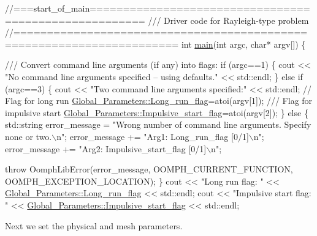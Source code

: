 \begin{DoxyCodeInclude}
\textcolor{comment}{//===start\_of\_main======================================================}
\textcolor{comment}{/// Driver code for Rayleigh-type problem}
\textcolor{comment}{}\textcolor{comment}{//======================================================================}
\textcolor{keywordtype}{int} \hyperlink{rayleigh__traction__channel_8cc_a0ddf1224851353fc92bfbff6f499fa97}{main}(\textcolor{keywordtype}{int} argc, \textcolor{keywordtype}{char}* argv[]) 
\{

\textcolor{comment}{}
\textcolor{comment}{ /// Convert command line arguments (if any) into flags:}
\textcolor{comment}{} \textcolor{keywordflow}{if} (argc==1)
  \{
   cout << \textcolor{stringliteral}{"No command line arguments specified -- using defaults."} << std::endl;
  \}
 \textcolor{keywordflow}{else} \textcolor{keywordflow}{if} (argc==3)
  \{
   cout << \textcolor{stringliteral}{"Two command line arguments specified:"} << std::endl;
   \textcolor{comment}{// Flag for long run}
   \hyperlink{namespaceGlobal__Parameters_a457472b8222bb6bb0d97b2aed78d1ef4}{Global\_Parameters::Long\_run\_flag}=atoi(argv[1]);\textcolor{comment}{}
\textcolor{comment}{   /// Flag for impulsive start}
\textcolor{comment}{}   \hyperlink{namespaceGlobal__Parameters_aec41eb8da4929003e5d78ef4b43c0ed9}{Global\_Parameters::Impulsive\_start\_flag}=atoi(argv[2]);
  \}
 \textcolor{keywordflow}{else}
  \{
   std::string error\_message = 
    \textcolor{stringliteral}{"Wrong number of command line arguments. Specify none or two.\(\backslash\)n"};
   error\_message +=
    \textcolor{stringliteral}{"Arg1: Long\_run\_flag [0/1]\(\backslash\)n"};
   error\_message +=
    \textcolor{stringliteral}{"Arg2: Impulsive\_start\_flag [0/1]\(\backslash\)n"};

   \textcolor{keywordflow}{throw} OomphLibError(error\_message,
                       OOMPH\_CURRENT\_FUNCTION,
                       OOMPH\_EXCEPTION\_LOCATION);
  \}
 cout << \textcolor{stringliteral}{"Long run flag: "} 
      <<  \hyperlink{namespaceGlobal__Parameters_a457472b8222bb6bb0d97b2aed78d1ef4}{Global\_Parameters::Long\_run\_flag} << std::endl;
 cout << \textcolor{stringliteral}{"Impulsive start flag: "} 
      <<  \hyperlink{namespaceGlobal__Parameters_aec41eb8da4929003e5d78ef4b43c0ed9}{Global\_Parameters::Impulsive\_start\_flag} << std::endl;

\end{DoxyCodeInclude}


Next we set the physical and mesh parameters.


